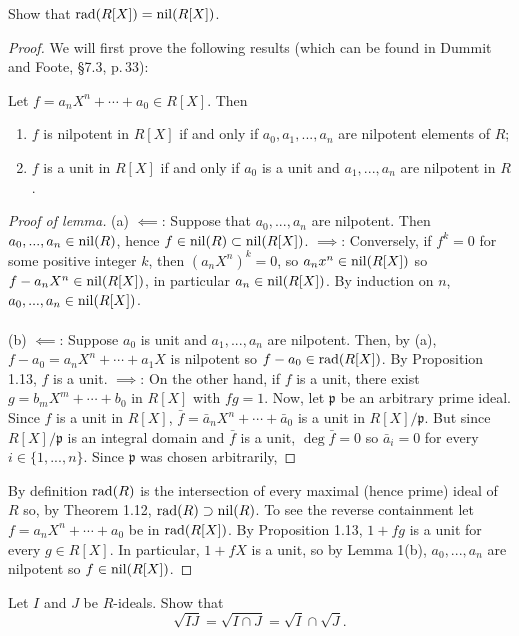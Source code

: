 \begin{problem}
Show that $\mathrm{rad}(R[X])=\mathrm{nil}(R[X])$.
\end{problem}
\begin{proof}
We will first prove the following results (which can be found in
Dummit and Foote, \S7.3, p.\,33):
\begin{lemma}
Let $f=a_nX^n+\cdots+a_0\in R[X]$. Then
\begin{enumerate}[noitemsep,label=(\alph*)]
\item $f$ is nilpotent in $R[X]$ if and only if $a_0,a_1,...,a_n$
  are nilpotent elements of $R$;
\item $f$ is a unit in $R[X]$ if and only if $a_0$ is a unit and
  $a_1,...,a_n$ are nilpotent in $R$.
\end{enumerate}
\end{lemma}
\begin{proof}[Proof of lemma]
\renewcommand\qedsymbol{$\vardiamondsuit$}
(a) $\impliedby$: Suppose that $a_0,...,a_n$ are nilpotent. Then
$a_0,...,a_n\in\mathrm{nil}(R)$, hence
$f\in\mathrm{nil}(R)\subset\mathrm{nil}(R[X])$. $\implies$: Conversely, if
$f^k=0$ for some positive integer $k$, then $(a_nX^n)^k=0$, so
$a_nx^n\in\mathrm{nil}(R[X])$ so $f-a_nX^n\in\mathrm{nil}(R[X])$, in particular
$a_n\in\mathrm{nil}(R[X])$. By induction on $n$,
$a_0,...,a_n\in\mathrm{nil}(R[X])$.
\\\\
(b) $\impliedby$: Suppose $a_0$ is unit and $a_1,...,a_n$ are
nilpotent. Then, by (a), $f-a_0=a_nX^n+\cdots+a_1X$ is nilpotent
so $f-a_0\in\mathrm{rad}(R[X])$. By Proposition 1.13, $f$ is a
unit. $\implies$: On the other hand, if $f$ is a unit, there
exist $g=b_mX^m+\cdots+b_0$ in $R[X]$ with $fg=1$. Now, let
$\mathfrak{p}$ be an arbitrary prime ideal. Since $f$ is a unit
in $R[X]$, $\bar f=\bar a_nX^n+\cdots+\bar a_0$ is a unit in
$R[X]/\mathfrak{p}$. But since $R[X]/\mathfrak{p}$ is an integral
domain and $\bar f$ is a unit, $\deg\bar f=0$ so $\bar a_i=0$ for
every $i\in\{1,...,n\}$. Since $\mathfrak{p}$ was chosen
arbitrarily,
\end{proof}
By definition $\mathrm{rad}(R)$ is the intersection of every maximal
(hence prime) ideal of $R$ so, by Theorem 1.12,
$\mathrm{rad}(R)\supset\mathrm{nil}(R)$. To see the reverse containment let
$f=a_nX^n+\cdots+a_0$ be in $\mathrm{rad}(R[X])$. By Proposition 1.13,
$1+fg$ is a unit for every $g\in R[X]$. In particular, $1+fX$ is
a unit, so by Lemma 1(b), $a_0,...,a_n$ are nilpotent so
$f\in\mathrm{nil}(R[X])$.
\end{proof}
\newpage
\begin{problem}
Let $I$ and $J$ be $R$-ideals. Show that
\[\sqrt{IJ}=\sqrt{I\cap J}=\sqrt{I}\cap\sqrt{J}.\]
\end{problem}
